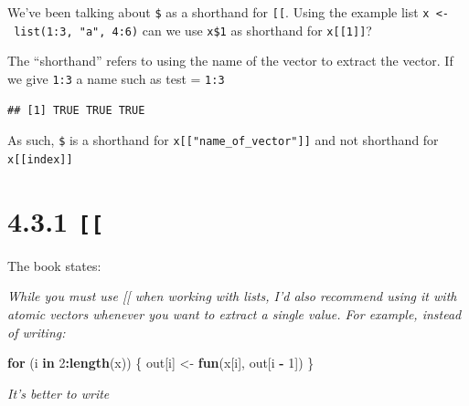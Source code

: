 \documentclass[]{book}
\newenvironment{Shaded}{\begin{snugshade}}{\end{snugshade}}
\newcommand{\ControlFlowTok}[1]{\textcolor[rgb]{0.13,0.29,0.53}{\textbf{#1}}}
\newcommand{\DataTypeTok}[1]{\textcolor[rgb]{0.13,0.29,0.53}{#1}}
\newcommand{\DecValTok}[1]{\textcolor[rgb]{0.00,0.00,0.81}{#1}}
\newcommand{\KeywordTok}[1]{\textcolor[rgb]{0.13,0.29,0.53}{\textbf{#1}}}
\newcommand{\NormalTok}[1]{#1}
\newcommand{\OperatorTok}[1]{\textcolor[rgb]{0.81,0.36,0.00}{\textbf{#1}}}
\newcommand{\StringTok}[1]{\textcolor[rgb]{0.31,0.60,0.02}{#1}}
\begin{document}
We've been talking about \texttt{\$} as a shorthand for \texttt{{[}{[}}. Using the example list \texttt{x\ \textless{}-\ list(1:3,\ "a",\ 4:6)} can we use \texttt{x\$1} as shorthand for \texttt{x{[}{[}1{]}{]}}?

The ``shorthand'' refers to using the name of the vector to extract the vector. If we give \texttt{1:3} a name such as test = \texttt{1:3}

\begin{Shaded}
\end{Shaded}

\begin{verbatim}
## [1] TRUE TRUE TRUE
\end{verbatim}

As such, \texttt{\$} is a shorthand for \texttt{x{[}{[}"name\_of\_vector"{]}{]}} and not shorthand for \texttt{x{[}{[}index{]}{]}}

\hypertarget{section}{%
\section*{\texorpdfstring{4.3.1 \texttt{{[}{[}}}{4.3.1 {[}{[}}}\label{section}}
\addcontentsline{toc}{section}{4.3.1 \texttt{{[}{[}}}

The book states:

\emph{While you must use {[}{[} when working with lists, I'd also recommend using it with atomic vectors whenever you want to extract a single value. For example, instead of writing:}

\begin{Shaded}
\begin{Highlighting}[]
\ControlFlowTok{for}\NormalTok{ (i }\ControlFlowTok{in} \DecValTok{2}\OperatorTok{:}\KeywordTok{length}\NormalTok{(x)) \{}
\NormalTok{  out[i] <-}\StringTok{ }\KeywordTok{fun}\NormalTok{(x[i], out[i }\OperatorTok{-}\StringTok{ }\DecValTok{1}\NormalTok{])}
\NormalTok{\}}
\end{Highlighting}
\end{Shaded}

\emph{It's better to write}
\end{document}
